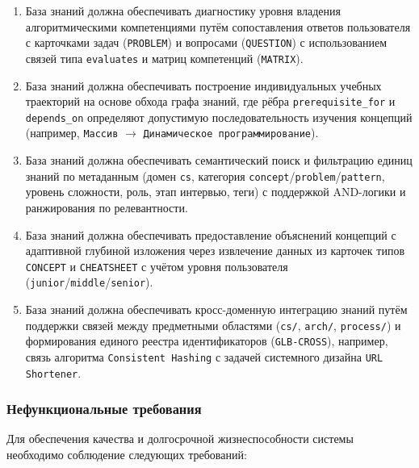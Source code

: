 \begin{enumerate}
    \item База знаний должна обеспечивать диагностику уровня владения алгоритмическими компетенциями путём сопоставления ответов пользователя с карточками задач (\texttt{PROBLEM}) и вопросами (\texttt{QUESTION}) с использованием связей типа \texttt{evaluates} и матриц компетенций (\texttt{MATRIX}).
    \item База знаний должна обеспечивать построение индивидуальных учебных траекторий на основе обхода графа знаний, где рёбра \texttt{prerequisite\_for} и \texttt{depends\_on} определяют допустимую последовательность изучения концепций (например, \texttt{Массив} $\rightarrow$ \texttt{Динамическое программирование}).
    \item База знаний должна обеспечивать семантический поиск и фильтрацию единиц знаний по метаданным (домен \texttt{cs}, категория \texttt{concept}/\texttt{problem}/\texttt{pattern}, уровень сложности, роль, этап интервью, теги) с поддержкой AND-логики и ранжирования по релевантности.
    \item База знаний должна обеспечивать предоставление объяснений концепций с адаптивной глубиной изложения через извлечение данных из карточек типов \texttt{CONCEPT} и \texttt{CHEATSHEET} с учётом уровня пользователя (\texttt{junior}/\texttt{middle}/\texttt{senior}).
    \item База знаний должна обеспечивать кросс-доменную интеграцию знаний путём поддержки связей между предметными областями (\texttt{cs/}, \texttt{arch/}, \texttt{process/}) и формирования единого реестра идентификаторов (\texttt{GLB-CROSS}), например, связь алгоритма \texttt{Consistent Hashing} с задачей системного дизайна \texttt{URL Shortener}.
\end{enumerate}\par

\subsubsection*{Нефункциональные требования}


Для обеспечения качества и долгосрочной жизнеспособности системы необходимо соблюдение следующих требований:

